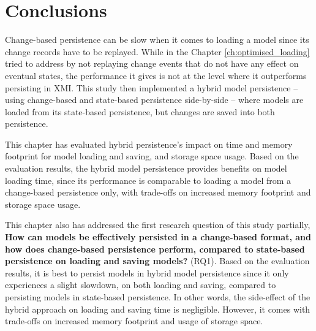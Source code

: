 \section{Conclusions}
\label{sec:conclusions_5}
Change-based persistence can be slow when it comes to loading a model since its change records have to be replayed. While in the Chapter \ref{ch:optimised_loading} tried to address by not replaying change events that do not have any effect on eventual states, the performance it gives is not at the level where it outperforms persisting in XMI. This study then implemented a hybrid model persistence -- using change-based and state-based persistence side-by-side -- where models are loaded from its state-based persistence, but changes are saved into both persistence.

This chapter has evaluated hybrid persistence's impact on time and memory footprint for model loading and saving, and storage space usage. Based on the evaluation results, the hybrid model persistence provides benefits on model loading time, since its performance is comparable to loading a model from a change-based persistence only, with trade-offs on increased memory footprint and storage space usage. 

This chapter also has addressed the first research question of this study partially, \textbf{How can models be effectively persisted in a change-based format, and how does change-based persistence perform, compared to state-based persistence on loading and saving models?} (RQ1). Based on the evaluation results, it is best to persist models in hybrid model persistence since it only experiences a slight slowdown, on both loading and saving, compared to persisting models in state-based persistence. In other words, the side-effect of the hybrid approach on loading and saving time is negligible. However, it comes with trade-offs on increased memory footprint and usage of storage space.
